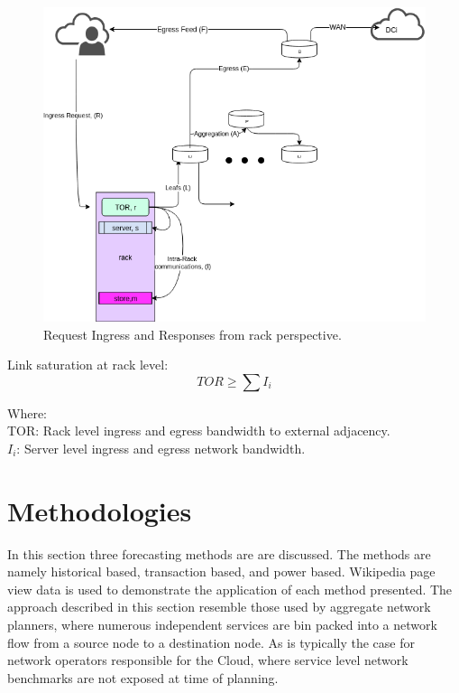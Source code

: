 \documentclass[conference]{IEEEtran}
\begin{document}
\begin{figure}[htbp]
\centering
\includegraphics[scale=.35]{rack_view.png}
\caption{Request Ingress and Responses from rack perspective.}
\label{DCN}
\end{figure}

Link saturation at rack level:
\begin{equation}
\label{TOR}
TOR \geq \sum{I_{i}}
\end{equation}

\begin{footnotesize}
Where: \\
\indent TOR: Rack level ingress and egress bandwidth to external adjacency.\\
\indent $I_{i}$: Server level ingress and egress network bandwidth.\\
\end{footnotesize}


\section{Methodologies}

In this section three forecasting methods are are discussed. The methods are namely historical based, transaction based, and power based. Wikipedia page view data is used to demonstrate the application of each method presented. The approach described in this section resemble those used by aggregate network planners, where numerous independent services are bin packed into a network flow from a source node to a destination node. As is typically the case for network operators responsible for the Cloud, where service level network benchmarks are not exposed at time of planning. 
\end{document}
